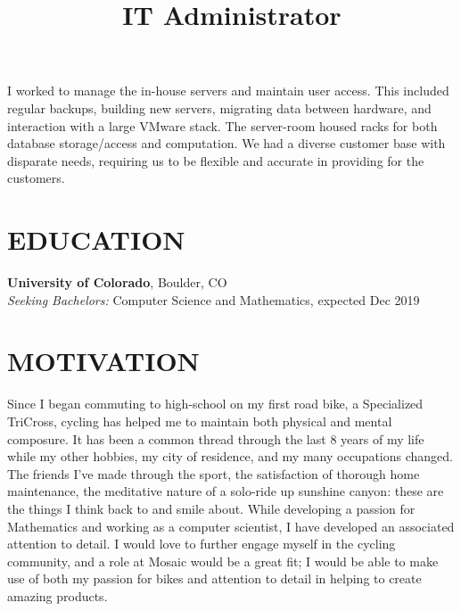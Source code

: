 \documentclass[margin]{res}
\begin{document}
\begin{resume}
\title{\textbf{IT Administrator}}
\begin{position}
I worked to manage the in-house servers and maintain user access. This included regular backups, building new servers, migrating data between hardware, and interaction with a large VMware stack. The server-room housed racks for both database storage/access and computation. We had a diverse customer base with disparate needs, requiring us to be flexible and accurate in providing for the customers.
\end{position}

\section{EDUCATION}
\textbf{University of Colorado}, Boulder, CO\\
{\sl Seeking Bachelors:} Computer Science and Mathematics, expected Dec 2019\hfill \\

\section{MOTIVATION}
Since I began commuting to high-school on my first road bike, a Specialized TriCross, cycling has helped me to maintain both physical and mental composure. It has been a  common thread through the last 8 years of my life while my other hobbies, my city of residence, and my many occupations changed. The friends I've made through the sport, the satisfaction of thorough home maintenance, the meditative nature of a solo-ride up sunshine canyon: these are the things I think back to and smile about. While developing a passion for Mathematics and working as a computer scientist, I have developed an associated attention to detail. I would love to further engage myself in the cycling community, and a role at Mosaic would be a great fit; I would be able to make use of both my passion for bikes and attention to detail in helping to create amazing products.

\end{resume}
\end{document}
